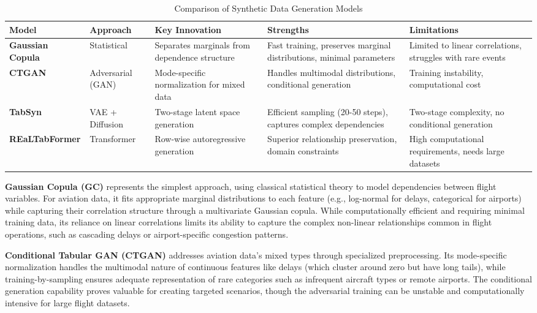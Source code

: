 \documentclass[conference]{IEEEtran}
\begin{document}
\begin{table}[htbp]
\centering
\caption{Comparison of Synthetic Data Generation Models}
\label{tab:generator_comparison}
\small
\begin{tabularx}{\textwidth}{l l X X X}
\toprule
\textbf{Model} & \textbf{Approach} & \textbf{Key Innovation} & \textbf{Strengths} & \textbf{Limitations} \\
\midrule
\textbf{Gaussian Copula} & Statistical & Separates marginals from dependence structure & Fast training, preserves marginal distributions, minimal parameters & Limited to linear correlations, struggles with rare events \\
\midrule
\textbf{CTGAN} & Adversarial (GAN) & Mode-specific normalization for mixed data & Handles multimodal distributions, conditional generation & Training instability, computational cost \\
\midrule
\textbf{TabSyn} & VAE + Diffusion & Two-stage latent space generation & Efficient sampling (20-50 steps), captures complex dependencies & Two-stage complexity, no conditional generation \\
\midrule
\textbf{REaLTabFormer} & Transformer & Row-wise autoregressive generation & Superior relationship preservation, domain constraints & High computational requirements, needs large datasets \\
\bottomrule
\end{tabularx}
\end{table}


\textbf{Gaussian Copula (GC)} represents the simplest approach, using classical statistical theory to model dependencies between flight variables. For aviation data, it fits appropriate marginal distributions to each feature (e.g., log-normal for delays, categorical for airports) while capturing their correlation structure through a multivariate Gaussian copula. While computationally efficient and requiring minimal training data, its reliance on linear correlations limits its ability to capture the complex non-linear relationships common in flight operations, such as cascading delays or airport-specific congestion patterns.

\textbf{Conditional Tabular GAN (CTGAN)} \cite{xu2019modeling} addresses aviation data's mixed types through specialized preprocessing. Its mode-specific normalization handles the multimodal nature of continuous features like delays (which cluster around zero but have long tails), while training-by-sampling ensures adequate representation of rare categories such as infrequent aircraft types or remote airports. The conditional generation capability proves valuable for creating targeted scenarios, though the adversarial training can be unstable and computationally intensive for large flight datasets.
\end{document}
